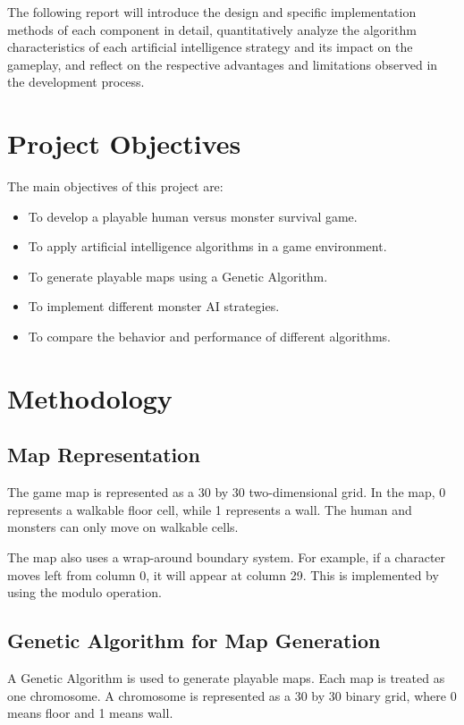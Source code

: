\documentclass[12pt,a4paper]{article}
\begin{document}
The following report will introduce the design and specific implementation methods of each component in detail, quantitatively analyze the algorithm characteristics of each artificial intelligence strategy and its impact on the gameplay, and reflect on the respective advantages and limitations observed in the development process.

\section{Project Objectives}

The main objectives of this project are:

\begin{itemize}
    \item To develop a playable human versus monster survival game.
    \item To apply artificial intelligence algorithms in a game environment.
    \item To generate playable maps using a Genetic Algorithm.
    \item To implement different monster AI strategies.
    \item To compare the behavior and performance of different algorithms.
\end{itemize}

\section{Methodology}

\subsection{Map Representation}

The game map is represented as a 30 by 30 two-dimensional grid. In the map, 0 represents a walkable floor cell, while 1 represents a wall. The human and monsters can only move on walkable cells.

The map also uses a wrap-around boundary system. For example, if a character moves left from column 0, it will appear at column 29. This is implemented by using the modulo operation.

\subsection{Genetic Algorithm for Map Generation}

A Genetic Algorithm is used to generate playable maps. Each map is treated as one chromosome. A chromosome is represented as a 30 by 30 binary grid, where 0 means floor and 1 means wall.
\end{document}
